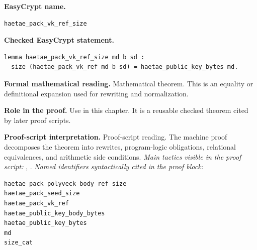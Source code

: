 \begin{formaltheorem}
\noindent\textbf{EasyCrypt name.}
\begin{lstlisting}[language=EasyCrypt,basicstyle=\ttfamily\scriptsize]
haetae_pack_vk_ref_size
\end{lstlisting}
\noindent\textbf{Checked EasyCrypt statement.}
\begin{lstlisting}[language=EasyCrypt,basicstyle=\ttfamily\scriptsize]
lemma haetae_pack_vk_ref_size md b sd :
  size (haetae_pack_vk_ref md b sd) = haetae_public_key_bytes md.
\end{lstlisting}
\noindent\textbf{Formal mathematical reading.}
Mathematical theorem. This is an equality or definitional expansion used for rewriting and normalization.

\noindent\textbf{Role in the proof.}
Use in this chapter. It is a reusable checked theorem cited by later proof scripts.

\noindent\textbf{Proof-script interpretation.}
Proof-script reading. The machine proof decomposes the theorem into rewrites, program-logic obligations, relational equivalences, and arithmetic side conditions.
\emph{Main tactics visible in the proof script:} , .
\emph{Named identifiers syntactically cited in the proof block:}
\begin{lstlisting}[language=EasyCrypt,basicstyle=\ttfamily\scriptsize]
haetae_pack_polyveck_body_ref_size
haetae_pack_seed_size
haetae_pack_vk_ref
haetae_public_key_body_bytes
haetae_public_key_bytes
md
size_cat
\end{lstlisting}

\end{formaltheorem}

